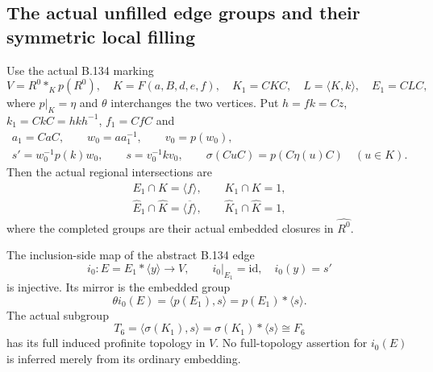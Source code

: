 \subsection*{The actual unfilled edge groups and their symmetric local filling}

\label{stmt:B136}
Use the actual B.134 marking
\[
 V=R^0*_{K}p(R^0),\quad K=F(a,B,d,e,f),\quad K_1=CKC,
 \quad L=\langle K,k\rangle,\quad E_1=CLC,
\]
where $p|_K=\eta$ and $\theta$ interchanges the two vertices.
Put $h=fk=Cz$, $k_1=CkC=hkh^{-1}$, $f_1=CfC$ and
\begin{equation}\label{eq:B136-words}
 \begin{gathered}
 a_1=CaC,\qquad w_0=aa_1^{-1},\qquad v_0=p(w_0),\\
 s'=w_0^{-1}p(k)w_0,\qquad s=v_0^{-1}kv_0,\qquad
 \sigma(CuC)=p(C\eta(u)C)\quad(u\in K).
 \end{gathered}
\end{equation}
Then the actual regional intersections are
\begin{equation}\label{eq:B136-regional-intersections}
 \begin{gathered}
 E_1\cap K=\langle f\rangle,\qquad K_1\cap K=1,\\
 \widehat E_1\cap\widehat K=\overline{\langle f\rangle},
 \qquad \widehat K_1\cap\widehat K=1,
 \end{gathered}
\end{equation}
where the completed groups are their actual embedded closures in
$\widehat{R^0}$.

The inclusion-side map of the abstract B.134 edge
\[
 i_0:E=E_1*\langle y\rangle\longrightarrow V,
 \qquad i_0|_{E_1}=\mathrm{id},\quad i_0(y)=s'
\]
is injective. Its mirror is the embedded group
\begin{equation}\label{eq:B136-two-edges}
 \theta i_0(E)=\langle p(E_1),s\rangle=p(E_1)*\langle s\rangle.
\end{equation}
The actual subgroup
\begin{equation}\label{eq:B136-target-free}
 T_6=\langle\sigma(K_1),s\rangle
       =\sigma(K_1)*\langle s\rangle\cong F_6
\end{equation}
has its full induced profinite topology in $V$.
No full-topology assertion for $i_0(E)$ is inferred merely from
its ordinary embedding.

